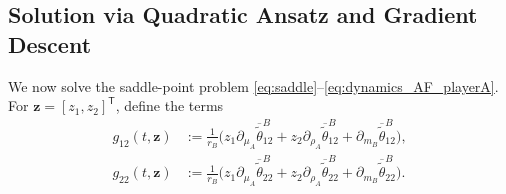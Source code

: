 \documentclass[letterpaper, 10 pt, conference]{ieeeconf}
\newcommand{\E}{\mathbb E}
\newcommand{\R}{\mathbb R}
\newcommand{\transpose}{^\mathsf{T}}
\newtheorem{remark}{Remark}
\newcommand{\rh}[1]{\textcolor{purple}{\textsf{[RH: #1]}}}
\begin{document}


\subsection{Solution via Quadratic Ansatz and Gradient Descent}

We now solve the saddle-point problem \eqref{eq:saddle}--\eqref{eq:dynamics_AF_playerA}. For $\bm{z}= [ z_1, z_2 ]\transpose$, define the terms 
\begin{align*}
    g_{12}(t,\bm{z}) &:= \tfrac{1}{r_B}\Big(z_1 \partial_{\mu_A} \overline{\widetilde{\theta}}_{12}^B + z_2 \partial_{\rho_A} \overline{\widetilde{\theta}}_{12}^B + \partial_{m_B} \overline{\widetilde{\theta}}_{12}^B\Big),\\
    g_{22}(t,\bm{z}) &:= \tfrac{1}{r_B}\Big(z_1 \partial_{\mu_A} \overline{\widetilde{\theta}}_{22}^B + z_2 \partial_{\rho_A} \overline{\widetilde{\theta}}_{22}^B + \partial_{m_B} \overline{\widetilde{\theta}}_{22}^B\Big).
\end{align*}
\end{document}
